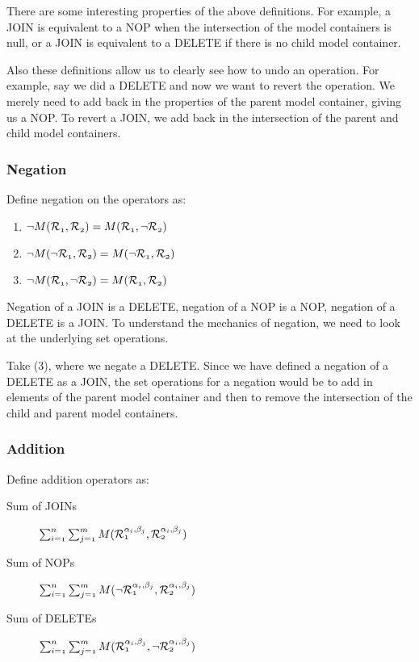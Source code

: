 \documentclass[12pt]{amsart}
\begin{document}
There are some interesting properties of the above definitions. For example,  a JOIN is equivalent to a NOP when the intersection of the model containers is null, or a JOIN is equivalent to a DELETE if there is no child model container.

Also these definitions allow us to clearly see how to undo an operation. For example, say we did a DELETE and now we want to revert the operation. We merely need to add back in the properties of the parent model container, giving us a NOP. To revert a JOIN, we add back in the intersection of the parent and child model containers.

\subsubsection{Negation}
Define negation on the operators as:
\begin{enumerate}
\item $\mathnormal{\neg M(\mathcal{R}_{1},\mathcal{R}_{2} ) =M(\mathcal{R}_{1},\neg \mathcal{R}_{2} ) }$
\item $\mathnormal{\neg M(\neg \mathcal{R}_{1},\mathcal{R}_{2} ) =M(\neg \mathcal{R}_{1}, \mathcal{R}_{2} ) }$
\item $\mathnormal{\neg M(\mathcal{R}_{1}, \neg \mathcal{R}_{2}) =  M(\mathcal{R}_{1},\mathcal{R}_{2} )} $ 
\end{enumerate}
Negation of a JOIN is a DELETE, negation of a NOP is a NOP, negation of a DELETE is a JOIN. To understand the mechanics of negation, we need to look at the underlying set operations. 

Take (3), where we negate a DELETE. Since we have defined a negation of a DELETE as a JOIN, the set operations for a negation would be to add in elements of the parent model container and then to remove the intersection of the child and parent model containers.
\subsubsection{Addition}
Define addition operators as:
\begin{description}
\item[Sum of JOINs] $\mathnormal{\sum_{i=1}^n \sum_{j=1}^m M(\mathcal{R}^{\alpha_{i} , \beta_{j}}_{1},\mathcal{R}^{\alpha_{i} , \beta_{j}}_{2} ) }$
\item[Sum of NOPs] $\mathnormal{\sum_{i=1}^n \sum_{j=1}^m M(\neg \mathcal{R}^{\alpha_{i} , \beta_{j}}_{1},\mathcal{R}^{\alpha_{i} , \beta_{j}}_{2} ) }$
\item[Sum  of DELETEs] $\mathnormal{\sum_{i=1}^n \sum_{j=1}^m M(\mathcal{R}^{\alpha_{i} , \beta_{j}}_{1},\neg \mathcal{R}^{\alpha_{i} , \beta_{j}}_{2} ) }$
\end{description}
\end{document}

